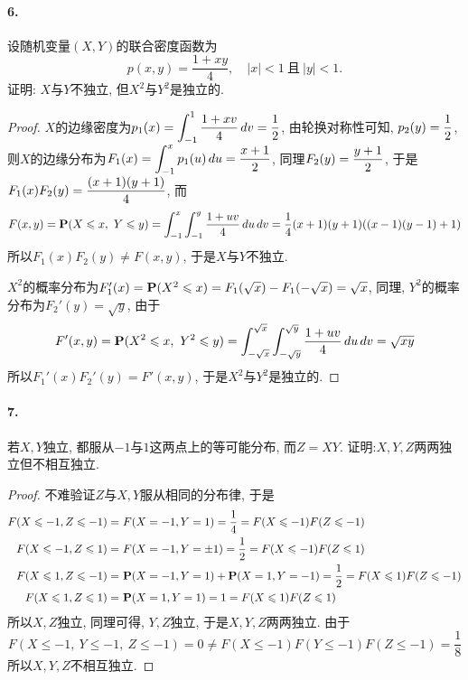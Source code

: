 \documentclass[12pt, a4paper, oneside]{ctexart}
\begin{document}
\paragraph{6.}设随机变量$(X,Y)$的联合密度函数为
\begin{equation*}
    p(x, y) = \frac{1+xy}{4},\quad |x| < 1\ \text{且}\ |y| < 1.
\end{equation*}
证明: $X$与$Y$不独立, 但$X^2$与$Y^2$是独立的.
\begin{proof}
    $X$的边缘密度为$\disp p_1(x) = \int_{-1}^{1}\frac{1+xv}{4}\,dv = \frac{1}{2}$, 由轮换对称性可知, $\disp p_2(y) = \frac{1}{2}$, 则$X$的边缘分布为$\disp F_1(x) = \int_{-1}^xp_1(u)\,du = \frac{x+1}{2}$, 同理$\disp F_2(y) = \frac{y+1}{2}$, 于是$\disp F_1(x)F_2(y) = \frac{(x+1)(y+1)}{4}$, 而
    \begin{equation*}
        F(x, y) = \P(X\leqslant x,\ Y\leqslant y) = \int_{-1}^x\int_{-1}^y\frac{1+uv}{4}\,du\,dv = \frac{1}{4}(x+1)(y+1)((x-1)(y-1)+1)
    \end{equation*}
    所以$F_1(x)F_2(y)\neq F(x, y)$, 于是$X$与$Y$不独立.

    $X^2$的概率分布为$F_1'(x) = \P(X^2\leqslant x) = F_1(\sqrt{x}) - F_1(-\sqrt{x}) = \sqrt{x}$, 同理, $Y^2$的概率分布为$F_2'(y) = \sqrt{y}$, 由于
    \begin{equation*}
        F'(x, y) = \P(X^2\leqslant x,\ Y^2\leqslant y) = \int_{-\sqrt{x}}^{\sqrt{x}}\int_{-\sqrt{y}}^{\sqrt{y}}\frac{1+uv}{4}\,du\,dv = \sqrt{xy}
    \end{equation*}
    所以$F_1'(x)F_2'(y) = F'(x, y)$, 于是$X^2$与$Y^2$是独立的.
\end{proof}
\paragraph{7.}若$X,Y$独立, 都服从$-1$与$1$这两点上的等可能分布, 而$Z = XY$. 证明:$X,Y,Z$两两独立但不相互独立.
\begin{proof}不难验证$Z$与$X,Y$服从相同的分布律, 于是
    \begin{equation*}
        \begin{aligned}
            F(X\leqslant -1, Z\leqslant -1) =&\  F(X=-1,Y=1) = \frac{1}{4} = F(X\leqslant -1)F(Z\leqslant -1)\\
            F(X\leqslant -1, Z\leqslant 1) =&\  F(X=-1,Y=\pm 1) = \frac{1}{2} = F(X\leqslant -1)F(Z\leqslant 1)\\
            F(X\leqslant 1, Z\leqslant -1) =&\  \P(X=-1,Y= 1)+\P(X=1, Y=-1) = \frac{1}{2} = F(X\leqslant 1)F(Z\leqslant -1)\\
            F(X\leqslant 1, Z\leqslant 1) =&\  \P(X=1,Y= 1) = 1 = F(X\leqslant 1)F(Z\leqslant 1)\\
        \end{aligned}
    \end{equation*}
    所以$X,Z$独立, 同理可得, $Y,Z$独立, 于是$X,Y,Z$两两独立. 由于
    \begin{equation*}
        F(X\leqslant -1,\ Y\leqslant -1,\ Z\leqslant -1) = 0 \neq F(X\leqslant -1)F(Y\leqslant -1)F(Z\leqslant -1) = \frac{1}{8}
    \end{equation*}
    所以$X,Y,Z$不相互独立.
\end{proof}
\end{document}

